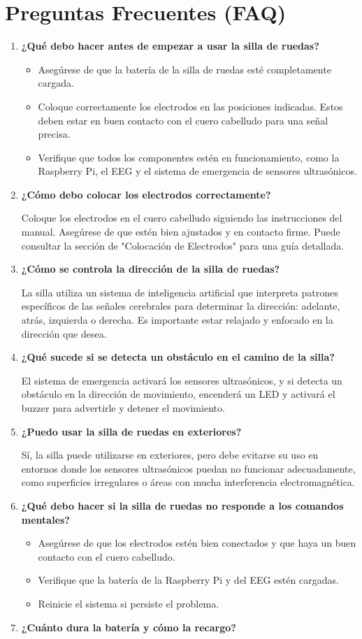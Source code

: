 \documentclass{article}
\begin{document}
\section{Preguntas Frecuentes (FAQ)}
\begin{enumerate}
    \item \textbf{¿Qué debo hacer antes de empezar a usar la silla de ruedas?}
    \begin{itemize}
        \item Asegúrese de que la batería de la silla de ruedas esté completamente cargada.
        \item Coloque correctamente los electrodos en las posiciones indicadas. Estos deben estar en buen contacto con el cuero cabelludo para una señal precisa.
        \item Verifique que todos los componentes estén en funcionamiento, como la Raspberry Pi, el EEG y el sistema de emergencia de sensores ultrasónicos.
    \end{itemize}
    \item \textbf{¿Cómo debo colocar los electrodos correctamente?}
    
    Coloque los electrodos en el cuero cabelludo siguiendo las instrucciones del manual. Asegúrese de que estén bien ajustados y en contacto firme. Puede consultar la sección de "Colocación de Electrodos" para una guía detallada.
    \item \textbf{¿Cómo se controla la dirección de la silla de ruedas?}
    
    La silla utiliza un sistema de inteligencia artificial que interpreta patrones específicos de las señales cerebrales para determinar la dirección: adelante, atrás, izquierda o derecha. Es importante estar relajado y enfocado en la dirección que desea.
    \item \textbf{¿Qué sucede si se detecta un obstáculo en el camino de la silla?}
    
    El sistema de emergencia activará los sensores ultrasónicos, y si detecta un obstáculo en la dirección de movimiento, encenderá un LED y activará el buzzer para advertirle y detener el movimiento.
    \item \textbf{¿Puedo usar la silla de ruedas en exteriores?}
    
    Sí, la silla puede utilizarse en exteriores, pero debe evitarse su uso en entornos donde los sensores ultrasónicos puedan no funcionar adecuadamente, como superficies irregulares o áreas con mucha interferencia electromagnética.
    \item \textbf{¿Qué debo hacer si la silla de ruedas no responde a los comandos mentales?}
    \begin{itemize}
        \item Asegúrese de que los electrodos estén bien conectados y que haya un buen contacto con el cuero cabelludo.
        \item Verifique que la batería de la Raspberry Pi y del EEG estén cargadas.
        \item Reinicie el sistema si persiste el problema.
    \end{itemize}
    \item \textbf{¿Cuánto dura la batería y cómo la recargo?}
    

\end{enumerate}
\end{document}
